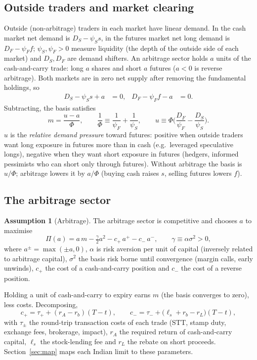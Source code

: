 \documentclass[11pt,a4paper]{article}
\theoremstyle{plain}
\theoremstyle{definition}
\newtheorem{assumption}{Assumption}
\theoremstyle{remark}
\begin{document}
\subsection{Outside traders and market clearing}
Outside (non-arbitrage) traders in each market have linear demand. In the cash market net demand is $D_S-\psi_S s$, in
the futures market net long demand is $D_F-\psi_F f$; $\psi_S,\psi_F>0$ measure liquidity (the depth of the outside
side of each market) and $D_S, D_F$ are demand shifters. An arbitrage sector holds $a$ units of the cash-and-carry
trade: long $a$ shares and short $a$ futures ($a<0$ is reverse arbitrage). Both markets are in zero net supply after
removing the fundamental holdings, so
\begin{align}
D_S-\psi_S s + a &= 0, & D_F-\psi_F f - a &= 0 .
\end{align}
Subtracting, the basis satisfies
\begin{equation}\label{eq:clear}
m=\frac{u-a}{\Phi},\qquad \frac1\Phi\equiv\frac1{\psi_F}+\frac1{\psi_S},\qquad u\equiv \Phi\Big(\frac{D_F}{\psi_F}-\frac{D_S}{\psi_S}\Big).
\end{equation}
$u$ is the \emph{relative demand pressure} toward futures: positive when outside traders want long exposure in futures
more than in cash (e.g.\ leveraged speculative longs), negative when they want short exposure in futures (hedgers,
informed pessimists who can short only through futures). Without arbitrage the basis is $u/\Phi$; arbitrage lowers it by
$a/\Phi$ (buying cash raises $s$, selling futures lowers $f$).

\subsection{The arbitrage sector}
\begin{assumption}[Arbitrage]\label{as:arb}
The arbitrage sector is competitive and chooses $a$ to maximise
\begin{equation}\label{eq:obj}
\Pi(a)= a\,m-\tfrac{\gamma}{2}a^2 - c_+\,a^+ - c_-\,a^-,\qquad \gamma\equiv\alpha\sigma^2>0,
\end{equation}
where $a^\pm=\max(\pm a,0)$, $\alpha$ is risk aversion per unit of capital (inversely related to arbitrage capital),
$\sigma^2$ the basis risk borne until convergence (margin calls, early unwinds), $c_+$ the cost of a cash-and-carry
position and $c_-$ the cost of a reverse position.
\end{assumption}
Holding a unit of cash-and-carry to expiry earns $m$ (the basis converges to zero), less costs. Decomposing,
\begin{equation}\label{eq:costs}
c_+=\tau_+ + (r_A-r_b)(T-t),\qquad c_-=\tau_- + \big(\ell_s+r_b-r_L\big)(T-t),
\end{equation}
with $\tau_\pm$ the round-trip transaction costs of each trade (STT, stamp duty, exchange fees, brokerage, impact),
$r_A$ the required return of cash-and-carry capital, $\ell_s$ the stock-lending fee and $r_L$ the rebate on short
proceeds. Section~\ref{sec:map} maps each Indian limit to these parameters.
\end{document}
